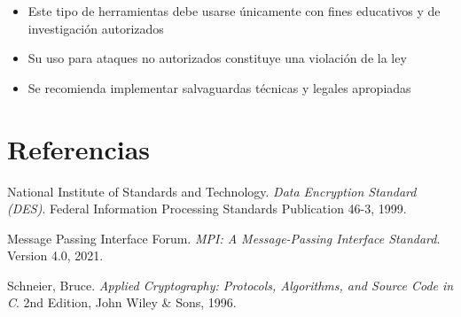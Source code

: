 \documentclass[12pt,letterpaper]{article}
\begin{document}
\begin{itemize}
    \item Este tipo de herramientas debe usarse únicamente con fines educativos y de investigación autorizados
    \item Su uso para ataques no autorizados constituye una violación de la ley
    \item Se recomienda implementar salvaguardas técnicas y legales apropiadas
\end{itemize}

\section{Referencias}

\begin{thebibliography}{99}

National Institute of Standards and Technology. 
\textit{Data Encryption Standard (DES)}. 
Federal Information Processing Standards Publication 46-3, 1999.

Message Passing Interface Forum. 
\textit{MPI: A Message-Passing Interface Standard}. 
Version 4.0, 2021.

Schneier, Bruce. 
\textit{Applied Cryptography: Protocols, Algorithms, and Source Code in C}. 
2nd Edition, John Wiley \& Sons, 1996.

\end{thebibliography}
\end{document}
